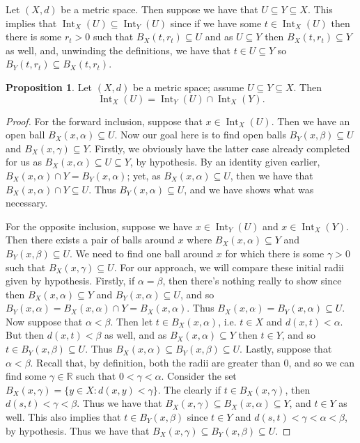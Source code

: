 \documentclass[9pt,reqno]{amsart}
\theoremstyle{definition}
\newtheorem{prop}{Proposition}[section]
\DeclareMathOperator{\Int}{Int}
\newcommand{\rr}{\mathbb R}
\begin{document}
Let $(X,d)$ be a metric space. Then suppose we have that $U \subseteq Y \subseteq X$. This implies that $\Int_X (U) \subseteq \Int_Y (U)$ since if we have some $t \in \Int _X (U)$ then there is some $r_t >0$ such that $B_X(t, r_t) \subseteq U$ and as $U \subseteq Y$ then $B_X(t, r_t ) \subseteq Y$ as well, and, unwinding the definitions, we have that $t \in U \subseteq Y$ so $B_Y(t, r_t) \subseteq B_X(t, r_t)$.
\begin{prop} 
Let $(X, d)$ be a metric space; assume $U \subseteq Y \subseteq X$. Then 
\[
\Int _X(U) = \Int _Y (U) \cap \Int _X(Y).
\]
\end{prop}
\begin{proof}
	For the forward inclusion, suppose that $ x \in \Int_X(U)$. Then we have an open ball $B_X(x, \alpha) \subseteq U$. Now our goal here is to find open balls $B_Y (x, \beta) \subseteq U$ and $B_X(x, \gamma) \subseteq Y$. Firstly, we obviously have the latter case already completed for us as $B_X(x, \alpha) \subseteq U \subseteq Y$, by hypothesis. By an identity given earlier, $B_X(x, \alpha) \cap Y = B_Y(x, \alpha)$; yet, as $B_X(x, \alpha )\subseteq U$, then we have that $B_X (x,\alpha) \cap Y \subseteq U$. Thus $B_Y(x, \alpha) \subseteq U$, and we have shows what was necessary. 
	
	For the opposite inclusion, suppose we have $x \in \Int_Y (U)$ and $x \in \Int_X(Y)$. Then there exists a pair of balls around $x$ where $B_X(x, \alpha) \subseteq Y$ and $B_Y(x, \beta) \subseteq U$. We need to find one ball around $x$ for which there is some $\gamma >0$ such that $B_X(x, \gamma) \subseteq U$. For our approach, we will compare these initial radii given by hypothesis. Firstly, if $\alpha = \beta$, then there's nothing really to show since then $B_X(x, \alpha) \subseteq Y$ and $B_ Y (x, \alpha) \subseteq  U$, and so $B_Y(x, \alpha) = B_X(x, \alpha) \cap Y = B_X(x, \alpha)$. Thus $B_X(x, \alpha) = B_Y(x, \alpha) \subseteq U$. Now suppose that $\alpha < \beta$. Then let $t \in B_X(x, \alpha)$, i.e. $t \in X$ and $d(x, t) < \alpha$. But then $d(x,t) < \beta$ as well, and as $B_X(x, \alpha) \subseteq Y$ then $t \in Y$, and so $t \in B_Y(x, \beta) \subseteq U$. Thus $B_X(x, \alpha) \subseteq B_Y(x, \beta) \subseteq U$. Lastly, suppose that $\alpha < \beta$. Recall that, by definition, both the radii are greater than $0$, and so we can find some $\gamma \in \rr$ such that $0 < \gamma < \alpha$. Consider the set $B_X(x, \gamma) = \{ y \in X \colon d(x,y) < \gamma \}$. The clearly if $t \in B_X(x, \gamma)$, then $d(s,t) < \gamma < \beta$. Thus we have that $B_X(x, \gamma) \subseteq  B_X(x, \alpha) \subseteq Y$, and $t \in Y$ as well. This also implies that $t \in B_Y(x, \beta)$ since $t \in Y$ and $d(s,t) < \gamma < \alpha < \beta$, by hypothesis. Thus we have that $B_X(x, \gamma) \subseteq B_Y(x, \beta) \subseteq U$.
\end{proof}
\end{document}

